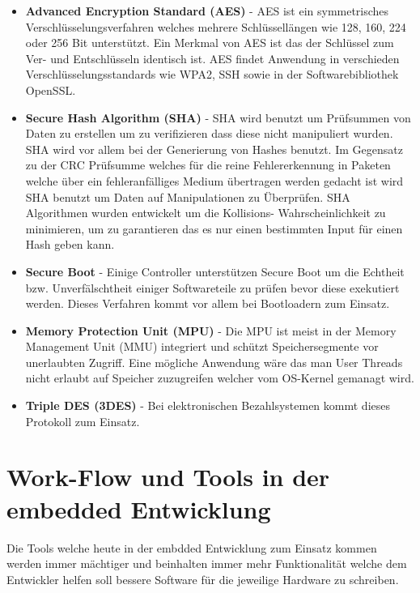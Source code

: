 \documentclass[MES,Master,ngerman]{twbook}%
\begin{document}
\begin{itemize}
	\item \textbf{Advanced Encryption Standard (AES)} - AES ist ein symmetrisches Verschlüsselungsverfahren welches mehrere Schlüssellängen wie 128, 160, 224 oder 256 Bit unterstützt. Ein Merkmal von AES ist das der Schlüssel zum Ver- und Entschlüsseln identisch ist. AES findet Anwendung in verschieden Verschlüsselungsstandards wie WPA2, SSH sowie in der Softwarebibliothek OpenSSL. \cite{Advanced Encryption Standard (AES) (Wikipedia) }
	\item \textbf{Secure Hash Algorithm (SHA)} - SHA wird benutzt um Prüfsummen von Daten zu erstellen um zu verifizieren dass diese nicht manipuliert wurden. SHA wird vor allem bei der Generierung von Hashes benutzt. Im Gegensatz zu der CRC Prüfsumme welches für die reine Fehlererkennung in Paketen welche über ein fehleranfälliges Medium übertragen werden gedacht ist wird SHA benutzt um Daten auf Manipulationen zu Überprüfen. SHA Algorithmen wurden entwickelt um die Kollisions- Wahrscheinlichkeit zu minimieren, um zu garantieren das es nur einen bestimmten Input für einen Hash geben kann. \cite{Secure Hash Algorithm (SHA) (Wikipedia) }
	\item \textbf{Secure Boot} - Einige Controller unterstützen Secure Boot um die Echtheit bzw. Unverfälschtheit einiger Softwareteile zu prüfen bevor diese exekutiert werden. Dieses Verfahren kommt vor allem bei Bootloadern zum Einsatz.
	\item \textbf{Memory Protection Unit (MPU)} - Die MPU ist meist in der Memory Management Unit (MMU) integriert und schützt Speichersegmente vor unerlaubten Zugriff. Eine mögliche Anwendung wäre das man User Threads nicht erlaubt auf Speicher zuzugreifen welcher vom OS-Kernel gemanagt wird.
	\item \textbf{Triple DES (3DES)} - Bei elektronischen Bezahlsystemen kommt dieses Protokoll zum Einsatz.
\end{itemize}


\section{Work-Flow und Tools in der embedded Entwicklung}
Die Tools welche heute in der embdded Entwicklung zum Einsatz kommen werden immer mächtiger und beinhalten immer mehr Funktionalität welche dem Entwickler helfen soll bessere Software für die jeweilige Hardware zu schreiben.
\end{document}

